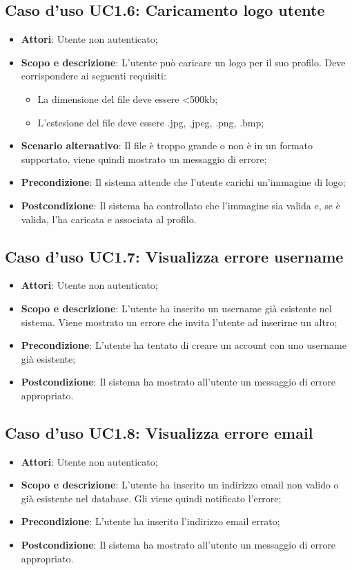 \documentclass[12pt,a4paper,titlepage]{article}
\begin{document}
	\subsection{Caso d'uso UC1.6: Caricamento logo utente}
	\label{UC1.6}
	\begin{itemize}
		\item \textbf{Attori}: Utente non autenticato;
		\item \textbf{Scopo e descrizione}: L'utente può caricare un logo per il suo profilo. Deve corrispondere ai seguenti requisiti:
		\begin{itemize}
			\item La dimensione del file deve essere <500kb;
			\item L'estesione del file deve essere .jpg, .jpeg, .png, .bmp;
		\end{itemize}
		\item \textbf{Scenario alternativo}: Il file è troppo grande o non è in un formato supportato, viene quindi mostrato un messaggio di errore;
		\item \textbf{Precondizione}: Il sistema attende che l'utente carichi un'immagine di logo;
		\item \textbf{Postcondizione}: Il sistema ha controllato che l'immagine sia valida e, se è valida, l'ha caricata e associata al profilo.
	\end{itemize}

	\subsection{Caso d'uso UC1.7: Visualizza errore username}
	\label{UC1.7}
	\begin{itemize}
		\item \textbf{Attori}: Utente non autenticato;
		\item \textbf{Scopo e descrizione}: L'utente ha inserito un username già esistente nel sistema. Viene mostrato un errore che invita l'utente ad inserirne un altro;
		\item \textbf{Precondizione}: L'utente ha tentato di creare un account con uno username già esistente;
		\item \textbf{Postcondizione}: Il sistema ha mostrato all'utente un messaggio di errore appropriato.
	\end{itemize}

	\subsection{Caso d'uso UC1.8: Visualizza errore email}
	\label{UC1.8}
	\begin{itemize}
		\item \textbf{Attori}: Utente non autenticato;
		\item \textbf{Scopo e descrizione}: L'utente ha inserito un indirizzo email non valido o già esistente nel database. Gli viene quindi notificato l'errore;
		\item \textbf{Precondizione}: L'utente ha inserito l'indirizzo email errato;
		\item \textbf{Postcondizione}: Il sistema ha mostrato all'utente un messaggio di errore appropriato.
	\end{itemize}
\end{document}
